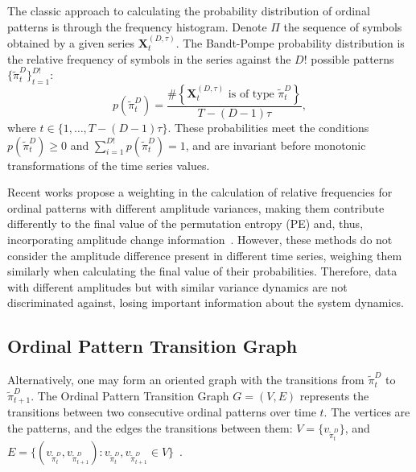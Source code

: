 \documentclass[journal]{IEEEtran}
\begin{document}
The classic approach to calculating the probability distribution of ordinal patterns is through the frequency histogram.
Denote $\Pi$ the sequence of symbols obtained by a given series $\mathbf{X}_t^{(D,\tau)}$.
The Bandt-Pompe probability distribution is the relative frequency of symbols in the series against the $D!$ possible patterns $\{\widetilde\pi_t^D \}_{t = 1}^{D!}$:
%
\begin{equation}
p(\widetilde\pi_t^D) = \frac{\#\left \{\mathbf{X}_t^{(D,\tau)} \text{ is of type } \widetilde\pi_t^D\right \}}{T- (D-1)\tau},  
\end{equation}
where  $t\in \{1, \dots, T-(D-1)\tau\}$.
These probabilities meet the conditions $p(\widetilde\pi_t^D) \ge 0$ and  $\sum_{i=1}^{D!} p(\widetilde\pi_t^D) = 1$, and are invariant before monotonic transformations of the time series values.

Recent works propose a weighting in the calculation of relative frequencies for ordinal patterns with different amplitude variances, making them contribute differently to the final value of the permutation entropy (PE) and, thus, incorporating amplitude change information~\cite{Fadlallah2013Weightedpermutation, xiao2009fine, azami2016amplitude}.
However, these methods do not consider the amplitude difference present in different time series, weighing them similarly when calculating the final value of their probabilities.
Therefore, data with different amplitudes but with similar variance dynamics are not discriminated against, losing important information about the system dynamics.

\subsection{Ordinal Pattern Transition Graph}\label{OPTG}

Alternatively, one may form an oriented graph with the transitions from $\widetilde\pi_t^D$ to $\widetilde\pi_{t+1}^D$. 
The Ordinal Pattern Transition Graph ${G} = ({V}, {E})$ 
represents the transitions between two consecutive ordinal patterns over time $t$.
The vertices are the patterns, and the edges the transitions between them:
$V = \{v_{\widetilde\pi_t^D}\}$, and 
$E = \{(v_{\widetilde\pi_t^D}, v_{\widetilde\pi_{t+1}^D}): v_{\widetilde\pi_t^D}, v_{\widetilde\pi_{t+1}^D} \in V \}$~\cite{Borges2019Transition}.
\end{document}
